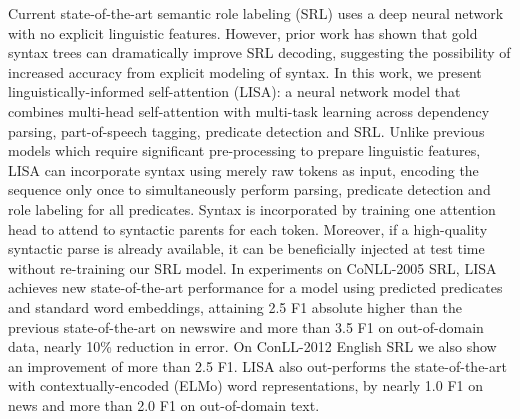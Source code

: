 Current state-of-the-art semantic role labeling (SRL) uses a deep neural network with no explicit linguistic features. However, prior work has shown that gold syntax trees can dramatically improve SRL decoding, suggesting the possibility of increased accuracy from explicit modeling of syntax. In this work, we present linguistically-informed self-attention (LISA): a neural network model that combines multi-head self-attention with multi-task learning across dependency parsing, part-of-speech tagging, predicate detection and SRL.  Unlike previous models which require significant pre-processing to prepare linguistic features, LISA can incorporate syntax using merely raw tokens as input, encoding the sequence only once to simultaneously perform parsing, predicate detection and role labeling for all predicates. Syntax is incorporated by training one attention head to attend to syntactic parents for each token. Moreover, if a high-quality syntactic parse is already available, it can be beneficially injected at test time without re-training our SRL model. In experiments on CoNLL-2005 SRL, LISA achieves new state-of-the-art performance for a model using predicted predicates and standard word embeddings, attaining 2.5 F1 absolute higher than the previous state-of-the-art on newswire and more than 3.5 F1 on out-of-domain data, nearly 10\% reduction in error. On ConLL-2012 English SRL we also show an improvement of more than 2.5 F1. LISA also out-performs the state-of-the-art with contextually-encoded (ELMo) word representations, by nearly 1.0 F1 on news and more than 2.0 F1 on out-of-domain text.
